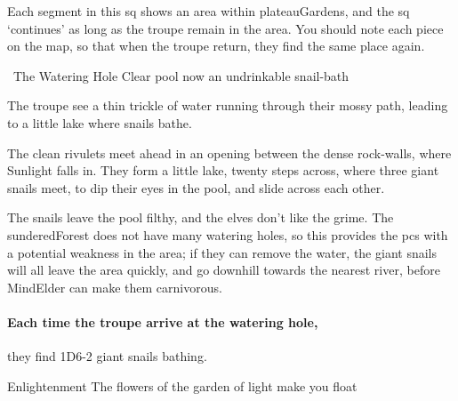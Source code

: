 


Each \gls{segment} in this \gls{sq} shows an area within \gls{plateauGardens}, and the \gls{sq} `continues' as long as the troupe remain in the \gls{area}.
You should note each piece on the map, so that when the troupe return, they find the same place again.

{\squash~The Watering Hole}%
{Clear pool now an undrinkable snail-bath}%
\label{shadePool}

The troupe see a thin trickle of water running through their mossy path, leading to a little lake where snails bathe.

\begin{boxtext}
  The clean rivulets meet ahead in an opening between the dense rock-walls, where Sunlight falls in.
  They form a little lake, twenty \glspl{step} across, where three giant snails meet, to dip their eyes in the pool, and slide across each other.
\end{boxtext}

The snails leave the pool filthy, and the elves don't like the grime.
The \gls{sunderedForest} does not have many watering holes, so this provides the \glspl{pc} with a potential weakness in the area; if they can remove the  water, the giant snails will all leave the area quickly, and go downhill towards the nearest river, before \gls{MindElder} can make them carnivorous.

\paragraph{Each time the troupe arrive at the watering hole,}
they find 1D6-2 giant snails bathing.

{Enlightenment}%
{The flowers of the garden of light make you float}%
\label{lightFlowers}


